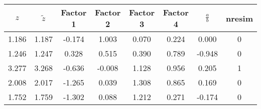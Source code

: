 \begin{tabular}{cccccccc}
\toprule
  $z$ &  $\tilde{z}$ &  Factor 1 &  Factor 2 &  Factor 3 &  Factor 4 &  $\frac{a}{b}$ &  nresim \\
\midrule
1.186 &        1.187 &    -0.174 &     1.003 &     0.070 &     0.224 &          0.000 &       0 \\
1.246 &        1.247 &     0.328 &     0.515 &     0.390 &     0.789 &         -0.948 &       0 \\
3.277 &        3.268 &    -0.636 &    -0.008 &     1.128 &     0.956 &          0.205 &       1 \\
2.008 &        2.017 &    -1.265 &     0.039 &     1.308 &     0.865 &          0.169 &       0 \\
1.752 &        1.759 &    -1.302 &     0.088 &     1.212 &     0.271 &         -0.174 &       0 \\
\bottomrule
\end{tabular}
